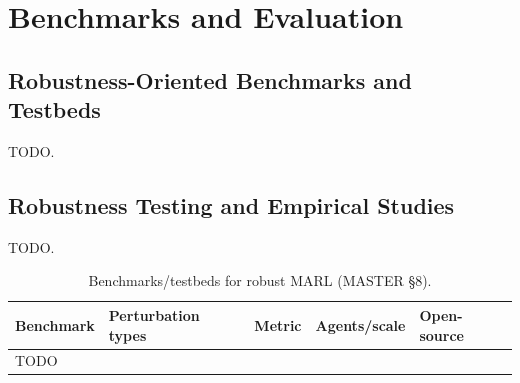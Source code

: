 \section{Benchmarks and Evaluation}
\label{sec:benchmarks}

\subsection{Robustness-Oriented Benchmarks and Testbeds}
TODO.

\subsection{Robustness Testing and Empirical Studies}
TODO.

\begin{table}[t]\centering\footnotesize
\caption{Benchmarks/testbeds for robust MARL (MASTER \S8).}
\label{tab:bench}
\begin{tabular}{lllll}
\toprule
Benchmark & Perturbation types & Metric & Agents/scale & Open-source \\
\midrule
TODO & & & & \\
\bottomrule
\end{tabular}
\end{table}

